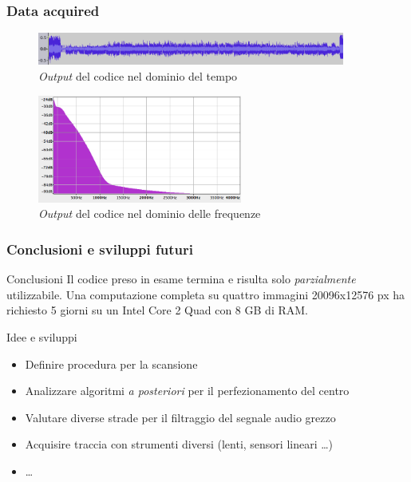 \begin{frame}
\frametitle{Data acquired}
\begin{figure}
\includegraphics[width=0.9\textwidth]{immagini/time-domain.png}
\caption{\emph{Output} del codice nel dominio del tempo}
\end{figure}
\begin{figure}
\includegraphics[width=0.6\textwidth]{immagini/freq-domain.png}
\caption{\emph{Output} del codice nel dominio delle frequenze}
\end{figure}
\end{frame}

\begin{frame}
\frametitle{Conclusioni e sviluppi futuri}
\begin{block}{Conclusioni}
Il codice preso in esame termina e risulta solo \emph{parzialmente} utilizzabile.
Una computazione completa su quattro immagini 20096x12576 px ha richiesto 5 giorni su 
un Intel Core 2 Quad con 8 GB di RAM.

\end{block}

\begin{block}{Idee e sviluppi}
\begin{itemize}
\item Definire procedura per la scansione
\item Analizzare algoritmi \emph{a posteriori} per il perfezionamento del centro
\item Valutare diverse strade per il filtraggio del segnale audio grezzo
\item Acquisire traccia con strumenti diversi (lenti, sensori lineari \dots)
\item \dots
\end{itemize}
\end{block}

\end{frame}
